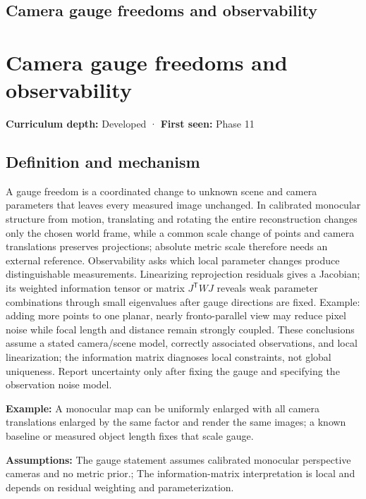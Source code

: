 \hypertarget{appendix-113f0267e5f4}{}
\section*{Camera gauge freedoms and observability}
\chapter{Camera gauge freedoms and observability}\label{appendix-113f0267e5f4-camera-gauge-freedoms-and-observability}

\textbf{Curriculum depth:} Developed · \textbf{First seen:} Phase 11

\section{Definition and mechanism}\label{appendix-113f0267e5f4-definition-and-mechanism}

A gauge freedom is a coordinated change to unknown scene and camera parameters that leaves every measured image unchanged. In calibrated monocular structure from motion, translating and rotating the entire reconstruction changes only the chosen world frame, while a common scale change of points and camera translations preserves projections; absolute metric scale therefore needs an external reference. Observability asks which local parameter changes produce distinguishable measurements. Linearizing reprojection residuals gives a Jacobian; its weighted information tensor or matrix \(J^{\mathsf T}WJ\) reveals weak parameter combinations through small eigenvalues after gauge directions are fixed. Example: adding more points to one planar, nearly fronto-parallel view may reduce pixel noise while focal length and distance remain strongly coupled. These conclusions assume a stated camera/scene model, correctly associated observations, and local linearization; the information matrix diagnoses local constraints, not global uniqueness. Report uncertainty only after fixing the gauge and specifying the observation noise model.

\textbf{Example:} A monocular map can be uniformly enlarged with all camera translations enlarged by the same factor and render the same images; a known baseline or measured object length fixes that scale gauge.

\textbf{Assumptions:} The gauge statement assumes calibrated monocular perspective cameras and no metric prior.; The information-matrix interpretation is local and depends on residual weighting and parameterization.

